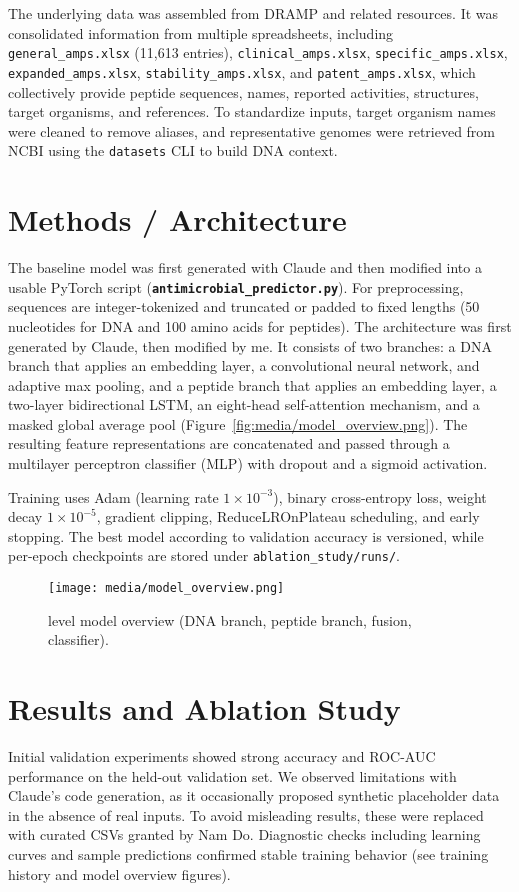 \documentclass{article}
\begin{document}
The underlying data was assembled from DRAMP and related resources. It was consolidated information from multiple spreadsheets, including \texttt{general\_amps.xlsx} (11,613 entries), \texttt{clinical\_amps.xlsx}, \texttt{specific\_amps.xlsx}, \texttt{expanded\_amps.xlsx}, \texttt{stability\_amps.xlsx}, and \texttt{patent\_amps.xlsx}, which collectively provide peptide sequences, names, reported activities, structures, target organisms, and references. To standardize inputs, target organism names were cleaned to remove aliases, and representative genomes were retrieved from NCBI using the \texttt{datasets} CLI to build DNA context. 
\section{Methods / Architecture}

The baseline model was first generated with Claude and then modified into a usable PyTorch script (\textbf{\texttt{antimicrobial\_predictor.py}}). For preprocessing, sequences are integer-tokenized and truncated or padded to fixed lengths (50 nucleotides for DNA and 100 amino acids for peptides). The architecture was first generated by Claude, then modified by me. It consists of two branches: a DNA branch that applies an embedding layer, a convolutional neural network, and adaptive max pooling, and a peptide branch that applies an embedding layer, a two-layer bidirectional LSTM, an eight-head self-attention mechanism, and a masked global average pool (Figure~\ref{fig:media/model_overview.png}). The resulting feature representations are concatenated and passed through a multilayer perceptron classifier (MLP) with dropout and a sigmoid activation.  

Training uses Adam (learning rate $1\times10^{-3}$), binary cross-entropy loss, weight decay $1\times10^{-5}$, gradient clipping, ReduceLROnPlateau scheduling, and early stopping. The best model according to validation accuracy is versioned, while per-epoch checkpoints are stored under \texttt{ablation\_study/runs/}.

\begin{figure}[htbp]
  \centering
  \texttt{[image: media/model\_overview.png]}
  \caption{level model overview (DNA branch, peptide branch, fusion, classifier).}
\end{figure}

\section{Results and Ablation Study}
Initial validation experiments showed strong accuracy and ROC-AUC performance on the held-out validation set. We observed limitations with Claude’s code generation, as it occasionally proposed synthetic placeholder data in the absence of real inputs. To avoid misleading results, these were replaced with curated CSVs granted by Nam Do. Diagnostic checks including learning curves and sample predictions confirmed stable training behavior (see training history and model overview figures).
\end{document}
